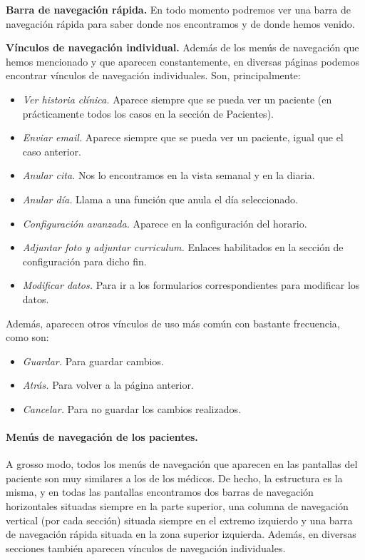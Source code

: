 \documentclass[a4paper,oneside,11pt]{book}
\begin{document}
			\textbf{Barra de navegación rápida.} En todo momento podremos ver una barra de navegación rápida para saber donde nos encontramos y de donde hemos venido.
			
			\textbf{Vínculos de navegación individual.} Además de los menús de navegación que hemos mencionado y que aparecen constantemente, en diversas páginas podemos encontrar vínculos de navegación individuales. Son, principalmente:
			\begin{itemize}
				\item \textit{Ver historia clínica.} Aparece siempre que se pueda ver un paciente (en prácticamente todos los casos en la sección de Pacientes).
				\item \textit{Enviar email.} Aparece siempre que se pueda ver un paciente, igual que el caso anterior.
				\item \textit{Anular cita.} Nos lo encontramos en la vista semanal y en la diaria.
				\item \textit{Anular día.} Llama a una función que anula el día seleccionado. 
				\item \textit{Configuración avanzada.} Aparece en la configuración del horario.
				\item \textit{Adjuntar foto y adjuntar curriculum.} Enlaces habilitados en la sección de configuración para dicho fin.
				\item \textit{Modificar datos.} Para ir a los formularios correspondientes para modificar los datos.
			\end{itemize}
			
			Además, aparecen otros vínculos de uso más común con bastante frecuencia, como son:
			\begin{itemize}
				\item \textit{Guardar.} Para guardar cambios.
				\item \textit{Atrás.} Para volver a la página anterior.
				\item \textit{Cancelar.} Para no guardar los cambios realizados.
			\end{itemize}
			
			
		
		\paragraph{Menús de navegación de los pacientes.} %
		\label{par:nav_menus_de_navegacion_de_los_pacientes}
		
		A grosso modo, todos los menús de navegación que aparecen en las pantallas del paciente son muy similares a los de los médicos. De hecho, la estructura es la misma, y en todas las pantallas encontramos dos barras de navegación horizontales situadas siempre en la parte superior, una columna de navegación vertical (por cada sección) situada siempre en el extremo izquierdo y una barra de navegación rápida situada en la zona superior izquierda. Además, en diversas secciones también aparecen vínculos de navegación individuales.
		
\end{document}
